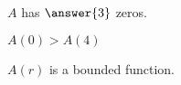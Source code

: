\documentclass{ximera}
\begin{document}
\begin{exercise}
\begin{question} 



$A$ has $\answer{3}$ zeros.

\end{question}








\begin{question} 



$A(0) > A(4)$ 
\begin{multipleChoice}
\end{multipleChoice}

\end{question}








\begin{question} 



$A(r)$ is a bounded function.
\begin{multipleChoice}
\end{multipleChoice}

\end{question}















\end{exercise}
\end{document}
